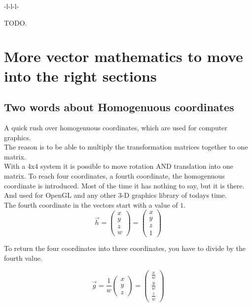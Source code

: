\documentclass[a4paper]{article}
\begin{document}
\begin{Example}
\begin{tabular}{-l-l-l-}

\end{tabular}

TODO.

\appendix

\section{More vector mathematics to move into the right sections}

\subsection{Two words about Homogenuous coordinates}

A quick rush over homogenuous coordinates, which are used for computer graphics.\\

The reason is to be able to multiply the transformation matrices together to one matrix.\\

With a 4x4 system it is possible to move rotation AND translation into one matrix. To reach four coordinates,
a fourth coordinate, the homogenuous coordinate is introduced. Most of the time it has nothing to say, but it
is there. And used for OpenGL and any other 3-D graphics library of todays time.\\

The fourth coordinate in  the vectors start with a value of $1$.\\

\begin{displaymath}
\vec{h} = \begin{pmatrix}x\\y\\z\\w\end{pmatrix} = \begin{pmatrix}x\\y\\z\\1\end{pmatrix} 
\end{displaymath}

To return the four coordinates into three coordinates, you have to divide by the fourth value.

\begin{displaymath}
\vec{g} = \frac{1}{w}\begin{pmatrix}x\\y\\z\end{pmatrix} =\begin{pmatrix}\frac{x}{w}\\\frac{y}{w}\\\frac{z}{w}\end{pmatrix} 
\end{displaymath}


\end{Example}
\end{document}
